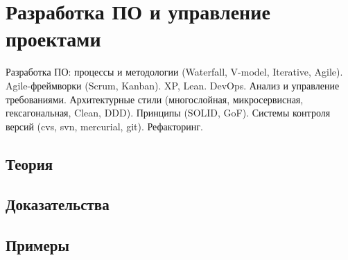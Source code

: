 
\section{Разработка ПО и управление проектами}
\label{sec:2.3b.12-sdlc-methodologies}

\begin{ticket}
Разработка ПО: процессы и методологии (Waterfall, V-model, Iterative, Agile). Agile-фреймворки (Scrum, Kanban). XP, Lean. DevOps. Анализ и управление требованиями. Архитектурные стили (многослойная, микросервисная, гексагональная, Clean, DDD). Принципы (SOLID, GoF). Системы контроля версий (cvs, svn, mercurial, git). Рефакторинг.
\end{ticket}

\subsection*{Теория}

\subsection*{Доказательства}

\subsection*{Примеры}
